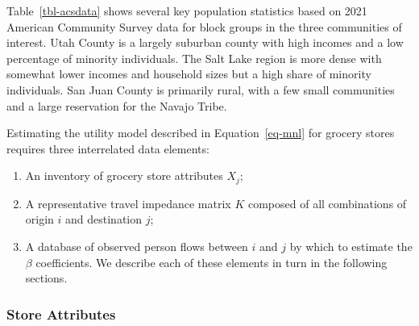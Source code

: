 \documentclass[
  letterpaper,
  number,
  review,
  3p]{elsarticle}
\providecommand{\tightlist}{%
  \setlength{\itemsep}{0pt}\setlength{\parskip}{0pt}}\usepackage{longtable,booktabs,array}
\begin{document}
Table~\ref{tbl-acsdata} shows several key population statistics based on
2021 American Community Survey data for block groups in the three
communities of interest. Utah County is a largely suburban county with
high incomes and a low percentage of minority individuals. The Salt Lake
region is more dense with somewhat lower incomes and household sizes but
a high share of minority individuals. San Juan County is primarily
rural, with a few small communities and a large reservation for the
Navajo Tribe.

\begin{table}

\caption{\label{tbl-acsdata}Demographic Statistics of Study Regions}


\end{table}%

Estimating the utility model described in Equation~\ref{eq-mnl} for
grocery stores requires three interrelated data elements:

\begin{enumerate}
\def\labelenumi{\arabic{enumi}.}
\tightlist
\item
  An inventory of grocery store attributes \(X_j\);
\item
  A representative travel impedance matrix \(K\) composed of all
  combinations of origin \(i\) and destination \(j\);
\item
  A database of observed person flows between \(i\) and \(j\) by which
  to estimate the \(\beta\) coefficients. We describe each of these
  elements in turn in the following sections.
\end{enumerate}

\subsubsection{Store Attributes}\label{store-attributes}
\end{document}
